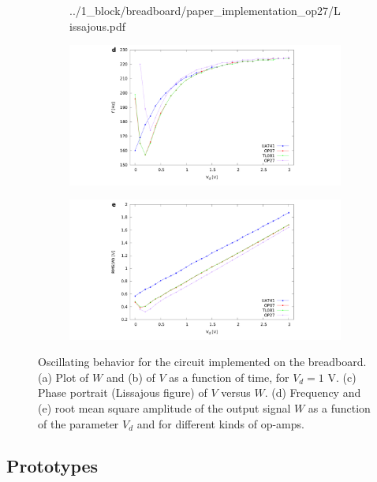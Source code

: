 \documentclass[a4paper,11pt,aps,secnumarabic,balancelastpage,amsmath,amssymb,floatfix,table]{article}
\begin{document}
\begin{figure}[H]
\begin{subfigure}{.39\textwidth}
        {../1_block/breadboard/paper_implementation_op27/Lissajous.pdf}
    \end{subfigure}
    \begin{subfigure}{.49\textwidth}
        \includegraphics[width=\linewidth,trim={10cm 0 9cm 0},clip,left]
        {../1_block/breadboard/freq_bread.pdf}
    \end{subfigure}
    \begin{subfigure}{.49\textwidth}
        \centering
        \includegraphics[width=\linewidth,trim={9cm 0 10cm 0},clip,right]
        {../1_block/breadboard/rms_bread.pdf}
    \end{subfigure}
    \caption{Oscillating behavior for the circuit implemented on
    the breadboard. (a) Plot of $W$ and (b) of $V$ as a function of time,
    for $V_d=1$ V.
    (c) Phase portrait (Lissajous figure) of $V$ versus $W$. (d)
    Frequency and (e) root mean square amplitude of the
    output signal $W$ as a function of the parameter $V_d$ and for
    different kinds of op-amps.}\label{fig:oscillation breadboard}
\end{figure}


\subsection{Prototypes}\label{sec:prototypes}
\end{document}

